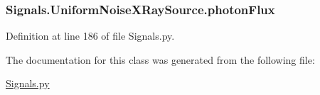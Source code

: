 \subsubsection[{\texorpdfstring{photon\+Flux}{photonFlux}}]{\setlength{\rightskip}{0pt plus 5cm}Signals.\+Uniform\+Noise\+X\+Ray\+Source.\+photon\+Flux}\hypertarget{classSignals_1_1UniformNoiseXRaySource_af240be1882d819db77da73100c4c95c5}{}\label{classSignals_1_1UniformNoiseXRaySource_af240be1882d819db77da73100c4c95c5}


Definition at line 186 of file Signals.\+py.



The documentation for this class was generated from the following file\+:\begin{DoxyCompactItemize}
\item 
\hyperlink{Signals_8py}{Signals.\+py}\end{DoxyCompactItemize}
